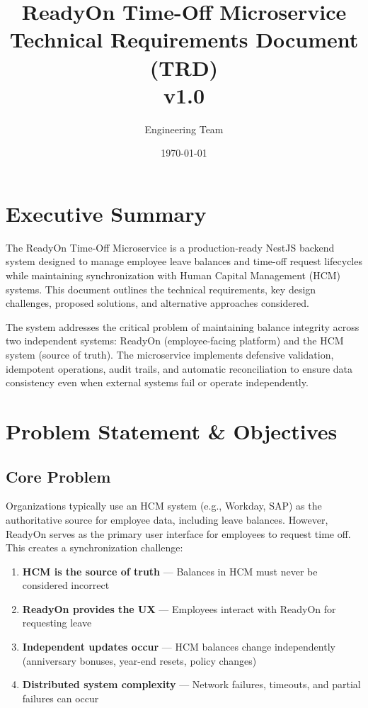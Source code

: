 \documentclass[12pt,a4paper]{article}
\title{%
    \textbf{ReadyOn Time-Off Microservice}\\
    \large Technical Requirements Document (TRD)\\
    \large v1.0
}
\author{Engineering Team}
\date{\today}
\begin{document}
\maketitle

\section*{Executive Summary}

The ReadyOn Time-Off Microservice is a production-ready NestJS backend system designed to manage employee leave balances and time-off request lifecycles while maintaining synchronization with Human Capital Management (HCM) systems. This document outlines the technical requirements, key design challenges, proposed solutions, and alternative approaches considered.

The system addresses the critical problem of maintaining balance integrity across two independent systems: ReadyOn (employee-facing platform) and the HCM system (source of truth). The microservice implements defensive validation, idempotent operations, audit trails, and automatic reconciliation to ensure data consistency even when external systems fail or operate independently.

\tableofcontents
\newpage

\section{Problem Statement \& Objectives}

\subsection{Core Problem}

Organizations typically use an HCM system (e.g., Workday, SAP) as the authoritative source for employee data, including leave balances. However, ReadyOn serves as the primary user interface for employees to request time off. This creates a synchronization challenge:

\begin{enumerate}
    \item \textbf{HCM is the source of truth} — Balances in HCM must never be considered incorrect
    \item \textbf{ReadyOn provides the UX} — Employees interact with ReadyOn for requesting leave
    \item \textbf{Independent updates occur} — HCM balances change independently (anniversary bonuses, year-end resets, policy changes)
    \item \textbf{Distributed system complexity} — Network failures, timeouts, and partial failures can occur
\end{enumerate}
\end{document}
